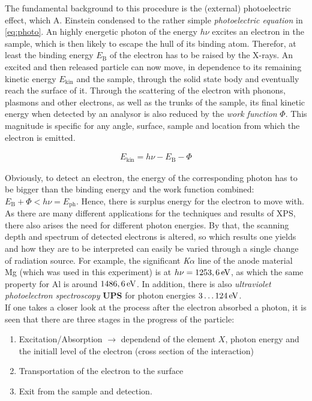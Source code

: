 \documentclass[numbers=noenddot,a4paper]{article}
\newcommand{\ix}[1]{_\text{#1}}
\newcommand{\tilt}[1]{\textit{#1}}
\newcommand{\fett}[1]{\textbf{#1}}
\begin{document}
		The fundamental background to this procedure is the (external) photoelectric effect, which A. Einstein condensed to the rather simple \tilt{photoelectric equation} in \autoref{eq:photo}. An highly energetic photon of the energy $h\nu$ excites an electron in the sample, which is then likely to escape the hull of its binding atom. Therefor, at least the binding energy $E\ix{B}$ of the electron has to be raised by the X-rays. An excited and then released particle can now move, in dependence to its remaining kinetic energy $E\ix{kin}$ and the sample, through the solid state body and eventually reach the surface of it. Through the scattering of the electron with phonons, plasmons and other electrons, as well as the trunks of the sample, its final kinetic energy when detected by an analysor is also reduced by the \tilt{work function} $\Phi$. This magnitude is specific for any angle, surface, sample and location from which the electron is emitted.

			\begin{align}
				E\ix{kin}=h\nu-E\ix{B}-\Phi \label{eq:photo}
			\end{align}

		Obviously, to detect an electron, the energy of the corresponding photon has to be bigger than the binding energy and the work function combined: $E\ix{B}+\Phi<h\nu=E\ix{ph}$. Hence, there is surplus energy for the electron to move with. As there are many different applications for the techniques and results of XPS, there also arises the need for different photon energies. By that, the scanning depth and spectrum of detected electrons is altered, so which results one yields and how they are to be interpreted can easily be varied through a single change of radiation source. For example, the significant \tilt{K}$\alpha$ line of the anode material Mg (which was used in this experiment) is at $h\nu=\unit[1253,6]{eV}$, as which the same property for Al is around $\unit[1486,6]{eV}$. In addition, there is also \tilt{ultraviolet photoelectron spectroscopy} \fett{UPS} for photon energies $\unit[3\dots124]{eV}$.\\
		If one takes a closer look at the process after the electron absorbed a photon, it is seen that there are three stages in the progress of the particle:

			\begin{enumerate}
				\item Excitation/Absorption $\rightarrow$ dependend of the element $X$, photon energy and the initiall level of the electron (cross section of the interaction)
				\item Transportation of the electron to the surface
				\item Exit from the sample and detection.
			\end{enumerate}
\end{document}
